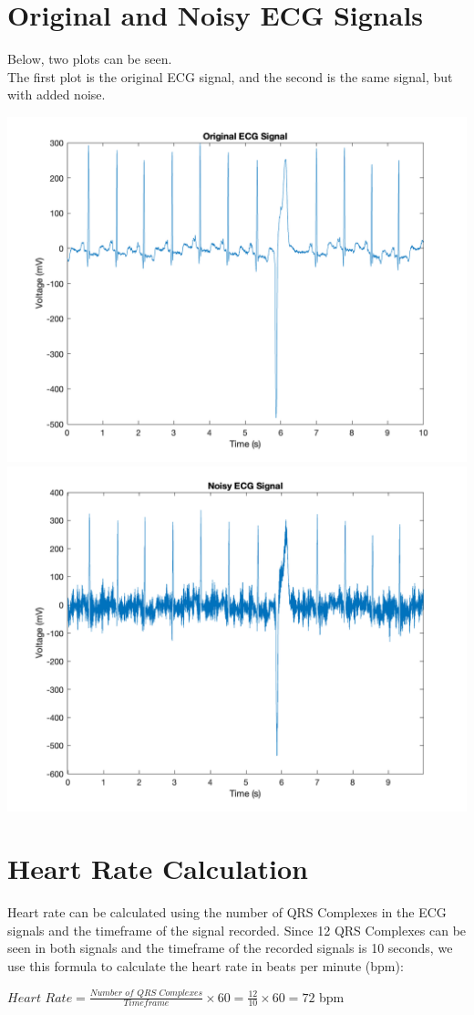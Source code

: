 \documentclass[11pt,oneside]{book}
\begin{document}
\chapter{Original and Noisy ECG Signals}
Below, two plots can be seen. 
\\The first plot is the original ECG signal, and the second is the same signal, but with added noise.
\begin{center}
\includegraphics[width=14cm]{graphics/orig.png}
\includegraphics[width=14cm]{graphics/noisy.png}
\end{center}
\chapter{Heart Rate Calculation}
Heart rate can be calculated using the number of QRS Complexes in the ECG signals and the timeframe of the signal recorded.
Since 12 QRS Complexes can be seen in both signals and the timeframe of the recorded signals is 10 seconds, we use this formula to calculate the heart rate in beats per minute (bpm):
\begin{center}
    $\textit{Heart Rate} = \frac{\textit{Number of QRS Complexes}}{\textit{Timeframe}} \times 60 = \frac{12}{10} \times 60 = 72$ bpm
\end{center}
\end{document}
